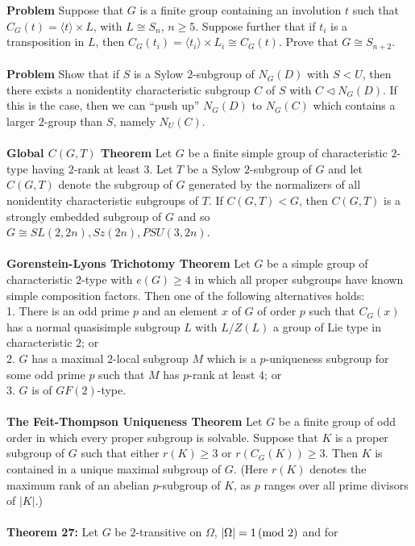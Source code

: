 {\bf Problem} Suppose that $G$ is a finite group containing an involution $t$ such that
$C_G(t) = \langle t \rangle \times L$, with $L \cong  S_n$, $n \ge  5$. Suppose
further that if $t_i$ is a transposition in $L$, 
then $C_G(t_i) = \langle t_i \rangle \times L_i \cong  C_G(t)$. Prove
that $G \cong  S_{n+2}$.
\\
\\
{\bf Problem} Show that if $S$ is a Sylow $2$-subgroup of $N_G(D)$ with $S<U$, then
there exists a nonidentity characteristic subgroup $C$ of $S$ with $C \lhd N_G(D)$.
If this is the case, then we can “push up” $N_G(D)$ to $N_G(C)$ which contains a
larger $2$-group than $S$, namely $N_U(C)$.
\\
\\
{\bf Global $C(G, T)$ Theorem} Let $G$ be a finite simple group of characteristic $2$-type
having $2$-rank at least $3$. Let $T$ be a Sylow $2$-subgroup of $G$ and let $C(G, T)$ denote
the subgroup of $G$ generated by the normalizers of all nonidentity characteristic
subgroups of $T$. If $C(G, T) < G$, then $C(G, T)$ is a strongly embedded subgroup of
$G$ and so $G \cong  SL(2, 2n), Sz(2n), PSU(3, 2n)$.
\\
\\
{\bf Gorenstein-Lyons Trichotomy Theorem} Let $G$ be a simple group of 
characteristic $2$-type with $e(G) \ge  4$ in which all proper subgroups have known simple
composition factors. Then one of the following alternatives holds:
\\
1. There is an odd prime $p$ and an element $x$ of $G$ of order $p$ such that $C_G(x)$
has a normal quasisimple subgroup $L$ with $L/Z(L)$ a group of Lie type in
characteristic $2$; or
\\
2. $G$ has a maximal $2$-local subgroup $M$ which is a $p$-uniqueness subgroup for
some odd prime $p$ such that $M$ has $p$-rank at least $4$; or
\\
3. $G$ is of $GF(2)$-type.
\\
\\
{\bf The Feit-Thompson Uniqueness Theorem} Let $G$ be a finite group of odd order in which 
every proper subgroup is solvable. Suppose that $K$ is a proper subgroup
of $G$ such that either $r(K) \geq 3$ or $r(C_G(K)) \ge 3$. Then $K$ is contained in a unique
maximal subgroup of $G$. (Here $r(K)$ denotes the maximum rank of an abelian $p$-subgroup of 
$K$, as $p$ ranges over all prime divisors of $|K|$.)
\\
\\
{\bf Theorem 27:} Let $G$ be $2$-transitive on $\Omega$, $|\Omega| = 1 \thinspace \textnormal{(mod } 2 \textnormal{)}$ and for
